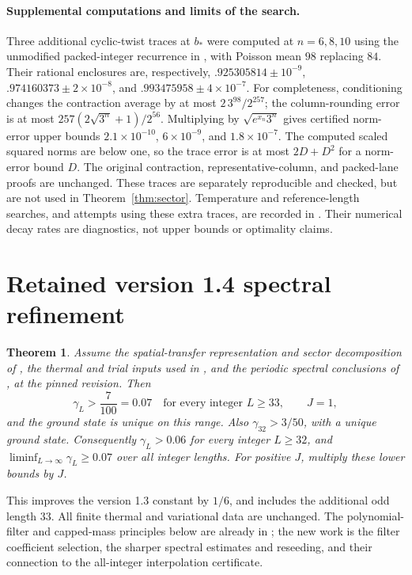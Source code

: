 \documentclass[11pt,a4paper]{article}
\newtheorem{theorem}{Theorem}
\newcommand{\gap}{\gamma}
\begin{document}
\paragraph{Supplemental computations and limits of the search.}
Three additional cyclic-twist traces at $b_*$ were computed at
$n=6,8,10$ using the unmodified packed-integer recurrence in
\cite[Appendix A]{upstream}, with Poisson mean $98$ replacing $84$.
Their rational enclosures are, respectively,
$.925305814\pm10^{-9}$, $.974160373\pm2\times10^{-8}$, and
$.993475958\pm4\times10^{-7}$.
For completeness, conditioning changes the contraction average by at
most $2\,3^{98}/2^{257}$; the column-rounding error is at most
$257(2\sqrt{3^n}+1)/2^{56}$. Multiplying by
$\sqrt{e^{x_n}3^n}$ gives certified norm-error upper bounds
$2.1\times10^{-10}$, $6\times10^{-9}$, and $1.8\times10^{-7}$.
The computed scaled squared norms are below one, so the trace error
is at most $2D+D^2$ for a norm-error bound $D$.
The original contraction, representative-column, and packed-lane
proofs are unchanged. These traces are separately reproducible and
checked, but are not used in Theorem~\ref{thm:sector}.
Temperature and reference-length searches, and attempts using these
extra traces, are recorded in . Their numerical
decay rates are diagnostics, not upper bounds or optimality claims.

\newpage
\section{Retained version 1.4 spectral refinement}
\begin{theorem}\label{thm:spectral}
Assume the spatial-transfer representation and sector decomposition of
\cite[Section 3]{upstream}, the thermal and trial inputs used in
\cite[Section 5]{upstream}, and the periodic spectral conclusions of
\cite[Proposition 3.4]{boundary}, at the pinned revision. Then
\[
 \boxed{\gap_L>\frac7{100}=0.07
 \quad\text{for every integer }L\ge33,\qquad J=1,}
\]
and the ground state is unique on this range. Also $\gap_{32}>3/50$,
with a unique ground state. Consequently $\gap_L>0.06$ for every integer
$L\ge32$, and $\liminf_{L\to\infty}\gap_L\ge0.07$ over all integer
lengths. For positive $J$, multiply these lower bounds by $J$.
\end{theorem}

This improves the version 1.3 constant by $1/6$, and includes the
additional odd length $33$. All finite thermal and variational data
are unchanged. The polynomial-filter and capped-mass principles below
are already in \cite[Section 5]{upstream}; the new work is the filter
coefficient selection, the sharper spectral estimates and reseeding,
and their connection to the all-integer interpolation certificate.
\end{document}
